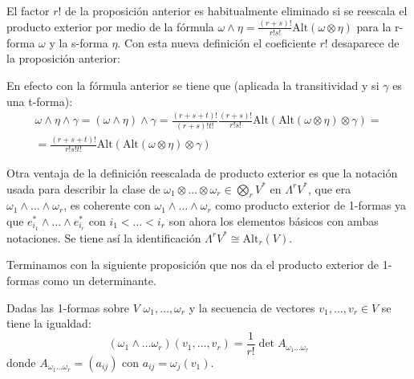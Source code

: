 \documentclass[../VD.tex]{subfiles}
\begin{document}
\begin{remark}\label{rem:reescalado}
  El factor \(r!\) de la proposición anterior es habitualmente eliminado si se
  reescala el producto exterior por medio de la fórmula
  \(\omega\wedge\eta=\frac{(r+s)!}{r!s!}\text{Alt}(\omega\otimes\eta)\) para la
  r-forma \(\omega\) y la s-forma \(\eta\). Con esta nueva definición el
  coeficiente \(r!\) desaparece de la proposición anterior:

  En efecto con la fórmula anterior se tiene que (aplicada la transitividad y si
  \(\gamma\) es una t-forma):
  \[\begin{array}{c}
      \omega\wedge\eta\wedge\gamma=(\omega\wedge\eta)\wedge\gamma=
      \frac{(r+s+t)!}{(r+s)!t!}\frac{(r+s)!}{r!s!}\text{Alt}
      (\text{Alt}(\omega\otimes\eta)\otimes\gamma)= \\
      =\frac{(r+s+t)!}{r!s!t!}\text{Alt}(\text{Alt}(\omega\otimes\eta)\otimes\gamma)
    \end{array}\]
\end{remark}

\begin{remark}
  Otra ventaja de la definición reescalada de producto exterior es que la
  notación usada para describir la clase de
  \(\omega_{1}\otimes\dots\otimes\omega_{r}\in\bigotimes_{r}V^{*}\) en
  \(\Lambda^{r}V^{*}\), que era \(\omega_{1}\wedge\dots\wedge\omega_{r}\), es
  coherente con \(\omega_{1}\wedge\dots\wedge\omega_{r}\) como producto exterior
  de 1-formas ya que \(e_{i_{1}}^{*}\wedge\dots\wedge e_{i_{r}}^{*}\) con
  \(i_{1}<\dots<i_{r}\) son ahora los elementos básicos con ambas notaciones. Se
  tiene así la identificación \(\Lambda^{r}V^{*}\cong\text{Alt}_{r}(V)\).
\end{remark}

Terminamos con la siguiente proposición que nos da el producto exterior de
1-formas como un determinante.

\begin{proposition}\label{prop:prod-ext-det}
  Dadas las 1-formas sobre \(V\) \(\omega_{1},\dots,\omega_{r}\) y la secuencia
  de vectores \(v_{1},\dots,v_{r}\in V\) se tiene la igualdad:
  \[
    (\omega_{1}\wedge\dots\omega_{r})(v_{1},\dots,v_{r})=
    \frac{1}{r!}\det{A_{\omega_{1}\dots\omega_{r}}}
  \]
  donde \(A_{\omega_{1}\dots\omega_{r}}=(a_{ij})\) con \(a_{ij}=\omega_{j}(v_{1})\).
\end{proposition}
\end{document}
